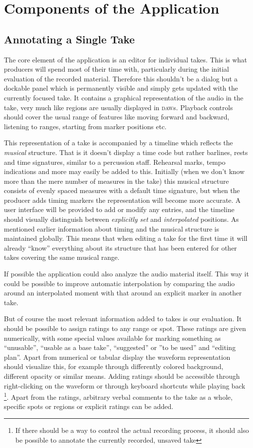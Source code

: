 \documentclass[11pt,a4paper]{article}
\begin{document}
\section{Components of the Application}

\subsection{Annotating a Single Take}
The core element of the application is an editor for individual takes.
This is what producers will spend most of their time with, particularly during the initial
evaluation of the recorded material.
Therefore this shouldn't be a dialog but a dockable panel which is permanently
visible and simply gets updated with the currently focused take.
It contains a graphical representation of the audio in the take, very
much like regions are usually displayed in \textsc{daw}s.
Playback controls should cover the usual range of features like moving forward
and backward, listening to ranges, starting from marker positions etc.

This representation of a take is accompanied by a timeline which reflects the
\emph{musical} structure.
That is it doesn't display a time code but rather barlines, rests
and time signatures, similar to a percussion staff.
Rehearsal marks, tempo indications and more may easily be added to this.
Initially (when we don't know more than the mere number of measures in the take)
this musical structure consists of evenly spaced measures with a default time
signature, but when the producer adds timing markers the representation will
become more accurate. A user interface will be provided to add or modify any
entries, and the timeline should visually distinguish between \emph{explicitly set} and
\emph{interpolated} positions.
As mentioned earlier information about timing and the musical structure is
maintained globally. This means that when editing a take for the first time
it will already “know” everything about its structure that has been entered for
other takes covering the same musical range.

If possible the application could also analyze the audio material itself. This
way it could be possible to improve automatic interpolation by comparing the
audio around an interpolated moment with that around an explicit marker in another
take.

But of course the most relevant information added to takes is our evaluation.
It should be possible to assign ratings to any range or spot.
These ratings are given numerically, with some special values available for
marking something as “unusable”, “usable as a base take”, “suggested” or ”to
be used” and “editing plan”.
Apart from numerical or tabular display the waveform representation should
visualize this, for example through differently colored background,
different opacity or similar means.
Adding ratings should be accessible through right-clicking on the waveform or
through keyboard shortcuts while playing back%
\footnote{If there should be a way to control the actual recording process,
it should also be possible to annotate the currently recorded, unsaved take}.
Apart from the ratings, arbitrary verbal comments to the take as a
whole, specific spots or regions or explicit ratings can be added.
\end{document}
